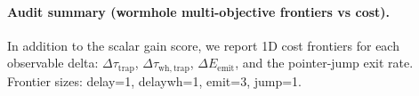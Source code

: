 \paragraph{Audit summary (wormhole multi-objective frontiers vs cost).} \AuditTag In addition to the scalar gain score, we report 1D cost frontiers for each observable delta: $\Delta\tau_{\mathrm{trap}}$, $\Delta\tau_{\mathrm{wh,trap}}$, $\Delta E_{\mathrm{emit}}$, and the pointer-jump exit rate. Frontier sizes: delay=1, delaywh=1, emit=3, jump=1.